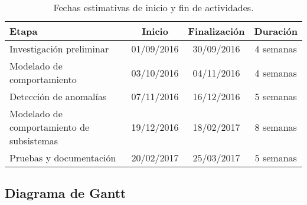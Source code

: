 \begin{table}[htbp]
	\begin{center}	
		\begin{tabular}{|l|c|c|c|}
			\hline 
			Etapa & Inicio & Finalización & Duración \\ \hline
			Investigación preliminar & 01/09/2016 & 30/09/2016 & 4 semanas \\
			Modelado de comportamiento & 03/10/2016 & 04/11/2016 & 4 semanas \\
			Detección de anomalías & 07/11/2016 & 16/12/2016 & 5 semanas \\
			Modelado de comportamiento de subsistemas & 19/12/2016 & 18/02/2017 & 8 semanas \\
			Pruebas y documentación & 20/02/2017 & 25/03/2017 & 5 semanas \\ \hline
		\end{tabular}
	\end{center}
	\caption{Fechas estimativas de inicio y fin de actividades.}
	\label{table:cronograma}
\end{table}

\newpage

\subsection*{Diagrama de Gantt}

